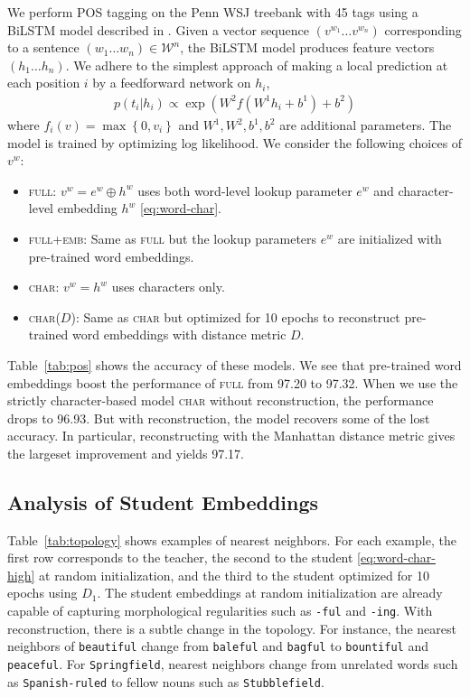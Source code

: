\documentclass[11pt,letterpaper,UTF8]{article}
\newcommand{\myset}[1]{\left\{#1\right\}}
\newcommand{\paren}[1]{\left(#1\right)}
\begin{document}
\begin{CJK}{UTF8}{gbsn}
We perform POS tagging on the Penn WSJ treebank with 45 tags
using a BiLSTM model described in .
Given a vector sequence $(v^{w_1} \ldots v^{w_n})$ corresponding to a sentence $(w_1 \ldots w_n) \in \mathcal{W}^n$, the BiLSTM model
produces feature vectors $(h_1 \ldots h_n)$.
We adhere to the simplest approach of making a local prediction at each position $i$
by a feedforward network on $h_i$,
\begin{align*}
p(t_i|h_i) \propto \exp\paren{W^2 f(W^1 h_i + b^1) + b^2}
\end{align*}
where $f_i(v) = \max\myset{0, v_i}$ and $W^1, W^2, b^1, b^2$ are additional parameters.
The model is trained by optimizing log likelihood.
We consider the following choices of $v^w$:
\begin{itemize}
\item \textsc{full}: $v^w = e^w \oplus h^w$ uses both word-level lookup parameter $e^w$ and character-level embedding $h^w$ \eqref{eq:word-char}.
\item \textsc{full+emb}: Same as \textsc{full} but the lookup parameters $e^w$ are initialized with pre-trained word embeddings.
\item \textsc{char}: $v^w = h^w$ uses characters only.
\item \textsc{char($D$)}: Same as \textsc{char} but optimized for 10 epochs to reconstruct pre-trained word embeddings with distance metric $D$.
\end{itemize}

Table~\ref{tab:pos} shows the accuracy of these models.
We see that pre-trained word embeddings boost the performance of \textsc{full} from 97.20 to 97.32.
When we use the strictly character-based model \textsc{char} without reconstruction, the performance drops to 96.93.
But with reconstruction, the model recovers some of the lost accuracy.
In particular, reconstructing with the Manhattan distance metric gives the largeset improvement and yields 97.17.


\subsection{Analysis of Student Embeddings}
\label{subsec:analysis}

Table~\ref{tab:topology} shows examples of nearest neighbors.
For each example, the first row corresponds to the teacher, the second to the student \eqref{eq:word-char-high} at random initialization,
and the third to the student optimized for 10 epochs using $D_1$.
The student embeddings at random initialization are already capable of capturing morphological regularities such as \texttt{-ful} and \texttt{-ing}.
With reconstruction, there is a subtle change in the topology.
For instance, the nearest neighbors of \texttt{beautiful} change from \texttt{baleful} and \texttt{bagful} to \texttt{bountiful} and \texttt{peaceful}.
For \texttt{Springfield}, nearest neighbors change from unrelated words such as \texttt{Spanish-ruled} to fellow nouns such as \texttt{Stubblefield}.


\end{CJK}
\end{document}
